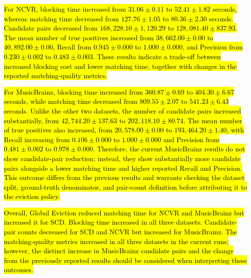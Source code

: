 \documentclass{ieeeaccess}
\begin{document}
\hl{For NCVR, blocking time increased from $31.06 \pm 0.11$ to $52.41 \pm 1.82$ seconds, whereas matching time decreased from $127.76 \pm 1.05$ to $80.36 \pm 2.30$ seconds. Candidate pairs decreased from $168{,}228.10 \pm 1{,}120.29$ to $128{,}081.40 \pm 837.93$. The mean number of true positives increased from $38{,}662.00 \pm 0.00$ to $40{,}892.00 \pm 0.00$, Recall from $0.945 \pm 0.000$ to $1.000 \pm 0.000$, and Precision from $0.230 \pm 0.002$ to $0.483 \pm 0.003$. These results indicate a trade-off between increased blocking cost and lower matching time, together with changes in the reported matching-quality metrics.}

\hl{For MusicBrainz, blocking time increased from $360.87 \pm 0.69$ to $404.30 \pm 6.67$ seconds, while matching time decreased from $809.55 \pm 2.07$ to $541.23 \pm 6.43$ seconds. Unlike the other two datasets, the number of candidate pairs increased substantially, from $42{,}744.20 \pm 137.63$ to $202{,}118.10 \pm 80.74$. The mean number of true positives also increased, from $20{,}578.00 \pm 0.00$ to $193{,}464.20 \pm 1.40$, with Recall increasing from $0.106 \pm 0.000$ to $1.000 \pm 0.000$ and Precision from $0.481 \pm 0.002$ to $0.978 \pm 0.000$. Therefore, the current MusicBrainz results do not show candidate-pair reduction; instead, they show substantially more candidate pairs alongside a lower matching time and higher reported Recall and Precision. This outcome differs from the previous results and warrants checking the dataset split, ground-truth denominator, and pair-count definition before attributing it to the eviction policy.}

\hl{Overall, Global Eviction reduced matching time for NCVR and MusicBrainz but increased it for SCD. Blocking time increased in all three datasets. Candidate-pair counts decreased for SCD and NCVR but increased for MusicBrainz. The matching-quality metrics increased in all three datasets in the current runs; however, the distinct increase in MusicBrainz candidate pairs and the change from the previously reported results should be considered when interpreting these outcomes.}
\end{document}
